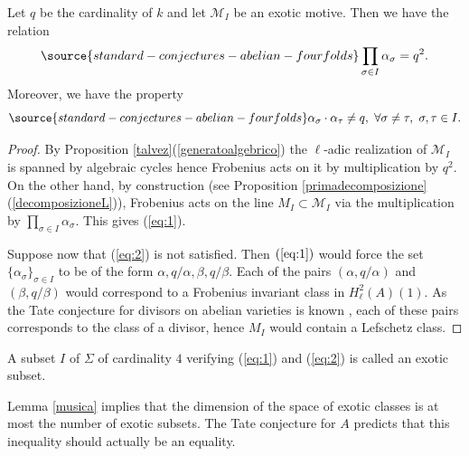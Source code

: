 \begin{lemma}
\notready\label{musica}
Let $q$ be the cardinality of $k$ and let $\mathcal{M}_I$ be an exotic motive. Then we have  the relation
\begin{equation} \label{eq:1}
\source{standard-conjectures-abelian-fourfolds}
\prod_{\sigma \in I}\alpha_\sigma =q^2.
\end{equation}
Moreover, we have the property
\begin{equation} \label{eq:2}
\source{standard-conjectures-abelian-fourfolds}
 \alpha_\sigma \cdot \alpha_\tau \neq q, \, \, \forall \sigma \neq \tau, \,\, \sigma,\tau \in I.
\end{equation}
\end{lemma}

\begin{proof}
By Proposition \ref{talvez}(\ref{generatoalgebrico}) the $\ell$-adic realization of $\mathcal{M}_I$ is spanned by algebraic cycles hence  Frobenius acts on it by multiplication by $q^2$.  On the other hand, by construction (see  Proposition \ref{primadecomposizione}(\ref{decomposizioneL})),  Frobenius acts on the line $ M_I\subset \mathcal{M}_I$ via the multiplication by $\prod_{\sigma \in I}\alpha_\sigma $. This gives (\ref{eq:1}).

Suppose now that  (\ref{eq:2}) is not satisfied.    Then $(\ref{eq:1})$ would force the set    $\{\alpha_\sigma\}_{\sigma \in I}$ to be of the form  $\alpha,q/\alpha, \beta, q/\beta$.   Each of the pairs $(\alpha,q/\alpha)$ and $(\beta, q/\beta)$ would correspond to a Frobenius invariant class in $H^2_\ell (A) (1)$. As the Tate conjecture for divisors on abelian varieties is known \cite[Theorem 4]{Tate}, each of these pairs corresponds to the class of a divisor, hence   $M_I$ would contain a Lefschetz class.
\end{proof}

\begin{definition}
\notready
A subset $I$ of $\Sigma$ of cardinality $4$ verifying (\ref{eq:1}) and (\ref{eq:2}) is called an exotic subset.
\end{definition}

\begin{remark}
\notready\label{completare}
Lemma \ref{musica} implies that the dimension of the space of exotic classes is at most the number of exotic subsets. The  Tate conjecture for $A$ predicts that this inequality should actually be an equality.
\end{remark}

